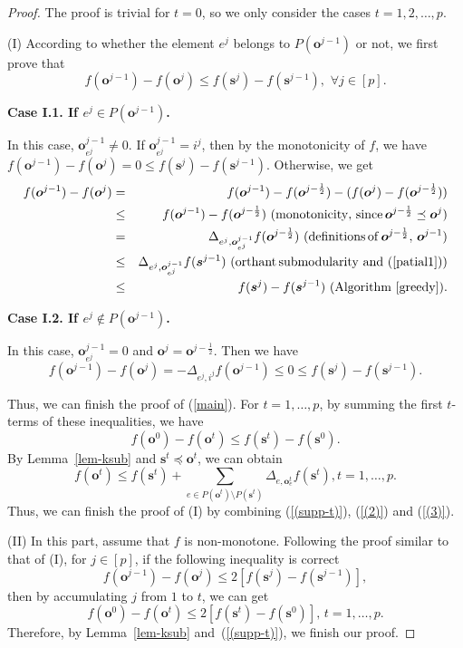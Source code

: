 \documentclass[preprint,12pt]{elsarticle}
\newcommand{\be}{\begin{equation}}
\newcommand{\ee}{\end{equation}}
\def\bea{\begin{eqnarray}}
\def\eea{\end{eqnarray}}
\def\nn{\nonumber}
\def\bo{\boldsymbol{o}}
\def\bs{\boldsymbol{s}}
\begin{document}
\begin{proof}
The proof is trivial for $t=0$, so we only consider the cases $t=1,2,\ldots,p$.

(I) According to whether the element $e^j$ belongs to $P(\bo^{j-1})$ or not,
we first prove that
\be\label{main}
f(\bo^{j-1})-f(\bo^j) \le f(\bs^j)-f(\bs^{j-1}),  \,\,\forall j\in [p].
\ee


\textbf{Case I.1. If $e^j\in P(\bo^{j-1})$.}

In this case, $\bo^{j-1}_{e^j}\ne0$. If $\bo^{j-1}_{e^j}=i^j$, then by the monotonicity of $f$, we have
$
f(\bo^{j-1})-f(\bo^j) = 0 \le f(\bs^j)-f(\bs^{j-1}).
$
Otherwise, we get
\bea
f(\bo^{j-1})-f(\bo^j) &= & f(\bo^{j-1})-f(\bo^{j-\frac{1}{2}})-(f(\bo^{j})-f(\bo^{j-\frac{1}{2}}))\nn \\
&\leq& f(\bo^{j-1})-f(\bo^{j-\frac{1}{2}}) \,\,({\rm monotonicity,\, since}\,\bo^{j-\frac{1}{2}}\preceq\bo^{j}) \nn \\
&= & \Delta_{e^j,\bo^{j-1}_{e^j}} f(\bo^{j-\frac{1}{2}})\,\,{\rm (definitions\, of\,}\bo^{j-\frac{1}{2}},\,\bo^{j-1})\label{case1-5} \\
&\leq & \Delta_{e^j,\bo^{j-1}_{e^j}} f(\bs^{j-1}) \,\,({\rm orthant\, submodularity\,\, and}\,\,(\ref{patial1})) \label{case1-6}\\
&\leq & f(\bs^j)-f(\bs^{j-1}) \,\,{\rm (Algorithm~\ref{greedy})}\label{case1-7}.
\eea

\textbf{Case I.2. If $e^j\notin P(\bo^{j-1})$.}

In this case, $\bo^{j-1}_{e^j}=0$ and $\bo^{j}=\bo^{j-\frac{1}{2}}$. Then we have
\[
f(\bo^{j-1})-f(\bo^j)= -\Delta_{e^j, i^j} f(\bo^{j-1}) \le 0\le f(\bs^j)-f(\bs^{j-1}).
\]

Thus, we can finish the proof of (\ref{main}). For $t=1, \dots, p$, by summing the first $t$-terms of these inequalities, we have
\begin{equation}\label{(2)}
f(\bo^0)-f(\bo^t) \le f(\bs^t)-f(\bs^0).
\end{equation}
By Lemma~\ref{lem-ksub} and $\bs^t\preceq \bo^t$, we can obtain
\begin{equation}\label{(3)}
f(\bo^t)\le f(\bs^t)+\sum_{e\in P(\bo^t)\setminus P(\bs^t)}\Delta_{e, \bo^t_e}f(\bs^t), t=1, \dots, p.
\end{equation}
Thus, we can finish the proof of (I) by combining (\ref{(supp-t)}), (\ref{(2)}) and (\ref{(3)}).

(II) In this part, assume that $f$ is non-monotone. Following the proof similar to that of (I), for $j\in [p]$, if the following inequality is correct
\begin{equation}\label{supp}
f(\bo^{j-1})-f(\bo^j) \le  2[f(\bs^j)-f(\bs^{j-1})],
\end{equation}
then by accumulating $j$ from $1$ to $t$, we can get
\[
f(\bo^0)-f(\bo^t)\le2[f(\bs^t)-f(\bs^0)], \, t=1, \dots, p.
\]
Therefore, by Lemma~\ref{lem-ksub} and~(\ref{(supp-t)}), we finish our proof.


\end{proof}
\end{document}
